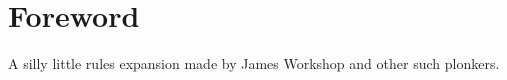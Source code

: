 \chapter*{Foreword}
\thispagestyle{empty}

\vspace{-2cm}
\vfill

\begin{center}
\begin{minipage}{15cm}
A silly little rules expansion made by James Workshop and other such plonkers.

\end{minipage}
\end{center}

\vfill
